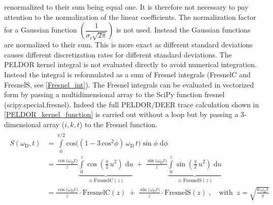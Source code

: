 \documentclass[pdftex,bezier,german,a4,twoside, headexclude,12pt,nochapterprefix, titlepage]{extarticle}
\begin{document}
renormalized to their sum being equal one. It is therefore not necessary to pay attention to the normalization of the linear coefficients.
The normalization factor for a Gaussian function
$\left(\dfrac{1}{\sigma_i \sqrt{2\pi}}\right)$ is not used. Instead the Gaussian functions are normalized to their sum. This is more exact as 
different standard deviations causes different discretization rates for different standard deviations. The PELDOR kernel integral is
not evaluated directly to avoid numerical integration. Instead the integral is reformulated as a sum of Fresnel integrals (FresnelC and FresnelS, see \autoref{Fresnel_int}). The Fresnel integrals can be evaluated in vectorized form by passing a multidimensional array to the SciPy function
fresnel (scipy.special.fresnel). Indeed the full PELDOR/DEER trace calculation shown in \autoref{PELDOR_kernel_function}
is carried out without a loop but by passing a 3-dimensional array ($i,k,t$) to the Fresnel function.
\begin{eqnarray}
\begin{split}
S(\omega_{\text{D}},t) & = \int\limits_{0}^{\pi/2}\mathrm{cos}\Big((1-3\,\mathrm{cos}^2\phi)\,\omega_{\text{D}}\,t\Big)\sin \phi\; \text{d}\phi \\ 
   & = 
   \frac{\cos{\big(\omega_{\text{D}}t \big)}}{z} 
   \underbrace{\int\limits_{0}^{z} \cos{\left( \frac{\pi}{2}\,u^{2} \right)} 
   \;\text{d}u}_{\equiv \text{FresnelC}(z)} \; + \; 
   \frac{\sin{\big(\omega_{\text{D}} t \big)}}{z}
   \underbrace{\int\limits_{0}^{z} 
   \sin{\left( \frac{\pi}{2}\,u^{2} \right)}\;\text{d}u}_{\equiv \text{FresnelS}(z)}      
\label{eqFresnel08} \\[2mm]
   & =  \frac{\cos{\big(\omega_{\text{D}}t \big)}}{z} \cdot \text{FresnelC}(z) \; + \;
   \frac{\sin{\big(\omega_{\text{D}} t\big)}}{z} \cdot \text{FresnelS}(z)\; ,
   \quad\text{with}\;\; z = \sqrt{\frac{6\,\omega_{\text{D}} t }{\pi}}
\label{eqFresnel09}  
\end{split}
\label{Fresnel_int}
\end{eqnarray}
\end{document}
